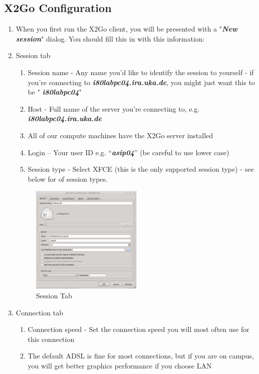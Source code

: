\subsection{X2Go Configuration}
\begin{enumerate}[resume]
	\item When you first run the X2Go client, you will be presented with a "\emph{\textbf{New session}}" dialog. You should fill this in with this information:
	\item Session tab
	\begin{enumerate}[label*=\arabic*.]
		\item Session name - Any name you'd like to identify the session to yourself - if you're connecting to \emph{\textbf{i80labpc04.ira.uka.de}}, you might just want this to be " \emph{\textbf{i80labpc04}}" 
		\item Host - Full name of the server you're connecting to, e.g. 
		\emph{\textbf{i80labpc04.ira.uka.de}}
		\item All of our compute machines have the X2Go server installed
		\item Login -- Your user ID e.g. ``\emph{\textbf{asip04}}'' (be careful to use lower case)
		\item Session type - Select XFCE (this is the only supported session type) - see below for of session types.
	\end{enumerate}
\begin{figure}[!htb]
	\centering
	\includegraphics[width=0.5\textwidth]{src/images/image1.png}
	\caption{Session Tab}
	\label{fig:fig1}
\end{figure}
	\item Connection tab
	\begin{enumerate}[label*=\arabic*.]
		\item Connection speed - Set the connection speed you will most often use for this connection 
		\item The default ADSL is fine for most connections, but if you are on campus, you will get better graphics performance if you choose LAN

\end{enumerate}
\end{enumerate}
